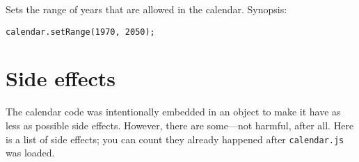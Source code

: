 \documentclass[a4paper,10pt]{article}
\begin{document}
Sets the range of years that are allowed in the calendar.  Synopsis:

\begin{verbatim}
calendar.setRange(1970, 2050);
\end{verbatim}







\section{Side effects}

The calendar code was intentionally embedded in an object to make it have as
less as possible side effects.  However, there are some---not harmful, after
all.  Here is a list of side effects; you can count they already happened after
\texttt{calendar.js} was loaded.
\end{document}
